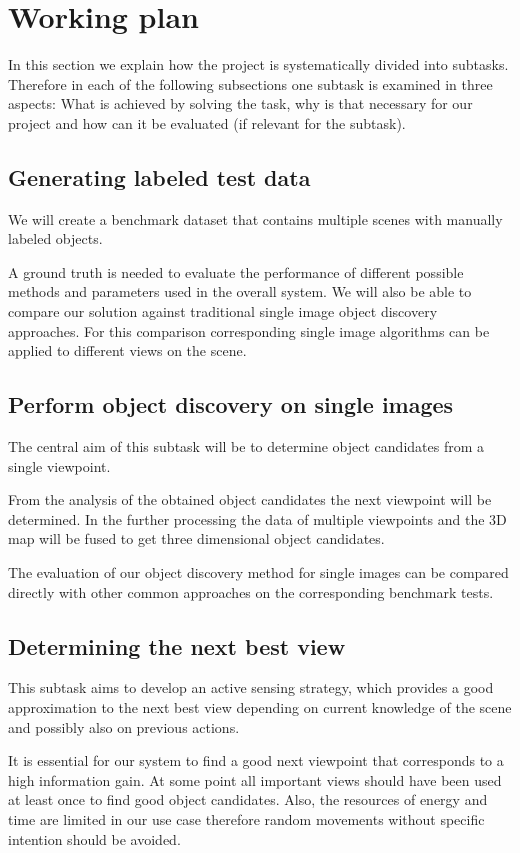 \documentclass[a4paper,11pt,english]{article}
\begin{document}
\section{Working plan}
In this section we explain how the project is systematically divided into subtasks.
Therefore in each of the following subsections one subtask is examined in three aspects: What is achieved by solving the task, why is that necessary for our project and how can it be evaluated (if relevant for the subtask).

\subsection{Generating labeled test data}
We will create a benchmark dataset that contains multiple scenes with manually labeled objects.

A ground truth is needed to evaluate the performance of different possible methods and parameters used in the overall system. We will also be able to compare our solution against traditional single image object discovery approaches. For this comparison corresponding single image algorithms can be applied to different views on the scene.

\subsection{Perform object discovery on single images}
The central aim of this subtask will be to determine object candidates from a single viewpoint.

From the analysis of the obtained object candidates the next viewpoint will be determined.
In the further processing the data of multiple viewpoints and the 3D map will be fused to get three dimensional object candidates.

The evaluation of our object discovery method for single images can be compared directly with other common approaches on the corresponding benchmark tests.

\subsection{Determining the next best view}
This subtask aims to develop an active sensing strategy, which provides a good approximation to the next best view depending on current knowledge of the scene and possibly also on previous actions.

It is essential for our system to find a good next viewpoint that corresponds to a high information gain.
At some point all important views should have been used at least once to find good object candidates.
Also, the resources of energy and time are limited in our use case therefore random movements without specific intention should be avoided.
\end{document}
